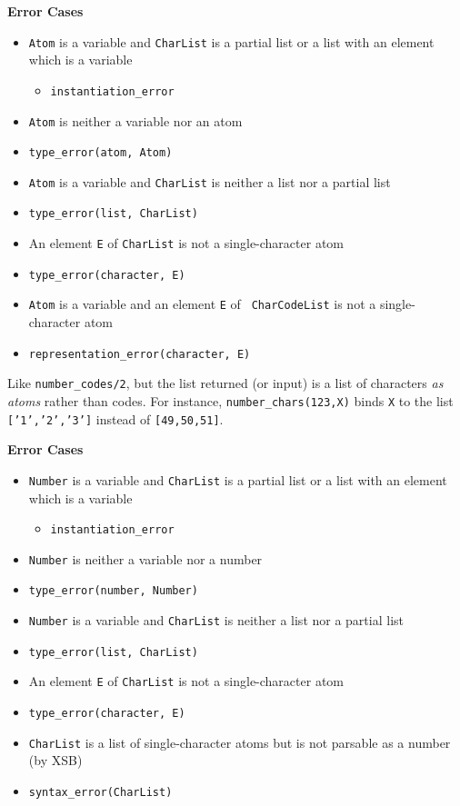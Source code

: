 \begin{description}
{\bf Error Cases}
\begin{itemize}
\item {\tt Atom} is a variable and {\tt CharList} is a partial
  list or a list with an element which is a variable
\begin{itemize}
\item {\tt instantiation\_error}
\end{itemize}
\item {\tt Atom} is neither a variable nor an atom 
\bi
\item {\tt type\_error(atom, Atom)}
\ei
\item {\tt Atom} is a variable and {\tt CharList} is neither a
  list nor a partial list 
\bi
\item {\tt type\_error(list, CharList)}
\ei
\item An element {\tt E} of {\tt CharList} is not a single-character
atom
\bi
\item {\tt type\_error(character, E)}
\ei
\item {\tt Atom} is a variable and an element {\tt E} of {\tt
  CharCodeList} is not a single-character atom
\bi
\item {\tt representation\_error(character, E)}
\ei
\end{itemize}

%
    Like \verb|number_codes/2|, but the list returned (or input) is a
    list of characters \emph{as atoms} rather than codes. For
    instance, \verb|number_chars(123,X)| binds {\tt X} to the list
    {\tt ['1','2','3']} instead of {\tt [49,50,51]}.

{\bf Error Cases}
\begin{itemize}
\item {\tt Number} is a variable and {\tt CharList} is a partial
  list or a list with an element which is a variable
\begin{itemize}
\item {\tt instantiation\_error}
\end{itemize}
\item {\tt Number} is neither a variable nor a number
\bi
\item {\tt type\_error(number, Number)}
\ei
\item {\tt Number} is a variable and {\tt CharList} is neither a
  list nor a partial list 
\bi
\item {\tt type\_error(list, CharList)}
\ei
\item An element {\tt E} of {\tt CharList} is not a single-character
atom
\bi
\item {\tt type\_error(character, E)}
\ei
\item {\tt CharList} is a list of single-character atoms but is not
  parsable as a number (by XSB)
\bi
\item {\tt syntax\_error(CharList)}
\ei
\end{itemize}


\end{description}
